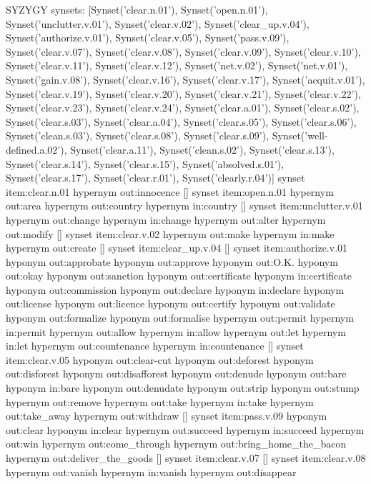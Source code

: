 \begin{draft}
SYZYGY
synsets:
[Synset('clear.n.01'), Synset('open.n.01'), Synset('unclutter.v.01'), Synset('clear.v.02'), Synset('clear\_up.v.04'), Synset('authorize.v.01'), Synset('clear.v.05'), Synset('pass.v.09'), Synset('clear.v.07'), Synset('clear.v.08'), Synset('clear.v.09'), Synset('clear.v.10'), Synset('clear.v.11'), Synset('clear.v.12'), Synset('net.v.02'), Synset('net.v.01'), Synset('gain.v.08'), Synset('clear.v.16'), Synset('clear.v.17'), Synset('acquit.v.01'), Synset('clear.v.19'), Synset('clear.v.20'), Synset('clear.v.21'), Synset('clear.v.22'), Synset('clear.v.23'), Synset('clear.v.24'), Synset('clear.a.01'), Synset('clear.s.02'), Synset('clear.s.03'), Synset('clear.a.04'), Synset('clear.s.05'), Synset('clear.s.06'), Synset('clean.s.03'), Synset('clear.s.08'), Synset('clear.s.09'), Synset('well-defined.a.02'), Synset('clear.a.11'), Synset('clean.s.02'), Synset('clear.s.13'), Synset('clear.s.14'), Synset('clear.s.15'), Synset('absolved.s.01'), Synset('clear.s.17'), Synset('clear.r.01'), Synset('clearly.r.04')]
synset item:clear.n.01
hypernym out:innocence
[]
synset item:open.n.01
hypernym out:area
hypernym out:country
hypernym in:country
[]
synset item:unclutter.v.01
hypernym out:change
hypernym in:change
hypernym out:alter
hypernym out:modify
[]
synset item:clear.v.02
hypernym out:make
hypernym in:make
hypernym out:create
[]
synset item:clear\_up.v.04
[]
synset item:authorize.v.01
hyponym out:approbate
hyponym out:approve
hyponym out:O.K.
hyponym out:okay
hyponym out:sanction
hyponym out:certificate
hyponym in:certificate
hyponym out:commission
hyponym out:declare
hyponym in:declare
hyponym out:license
hyponym out:licence
hyponym out:certify
hyponym out:validate
hyponym out:formalize
hyponym out:formalise
hypernym out:permit
hypernym in:permit
hypernym out:allow
hypernym in:allow
hypernym out:let
hypernym in:let
hypernym out:countenance
hypernym in:countenance
[]
synset item:clear.v.05
hyponym out:clear-cut
hyponym out:deforest
hyponym out:disforest
hyponym out:disafforest
hyponym out:denude
hyponym out:bare
hyponym in:bare
hyponym out:denudate
hyponym out:strip
hyponym out:stump
hypernym out:remove
hypernym out:take
hypernym in:take
hypernym out:take\_away
hypernym out:withdraw
[]
synset item:pass.v.09
hyponym out:clear
hyponym in:clear
hypernym out:succeed
hypernym in:succeed
hypernym out:win
hypernym out:come\_through
hypernym out:bring\_home\_the\_bacon
hypernym out:deliver\_the\_goods
[]
synset item:clear.v.07
[]
synset item:clear.v.08
hypernym out:vanish
hypernym in:vanish
hypernym out:disappear

\end{draft}
